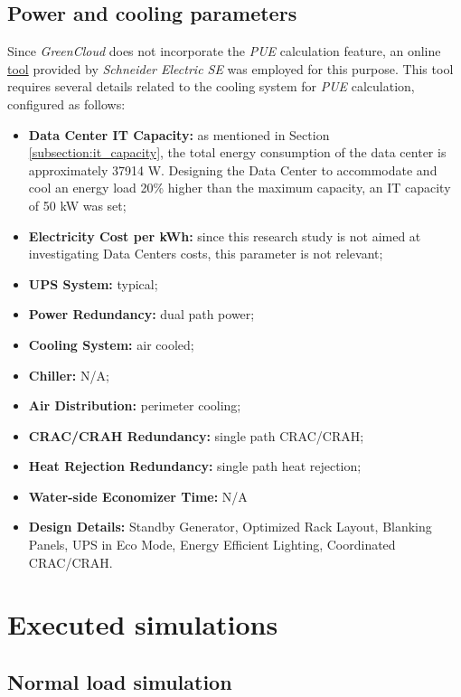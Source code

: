 \subsection{Power and cooling parameters}
Since \emph{GreenCloud} does not incorporate the \emph{PUE} calculation feature, an online \href{https://www.se.com/ww/en/work/solutions/system/s1/data-center-and-network-systems/trade-off-tools/data-center-efficiency-and-pue-calculator/}{tool} provided by \emph{Schneider Electric SE} was employed for this purpose. This tool requires several details related to the cooling system for \emph{PUE} calculation, configured as follows:
\begin{itemize}
    \item \textbf{Data Center IT Capacity:} as mentioned in Section \ref{subsection:it_capacity}, the total energy consumption of the data center is approximately 37914 W. Designing the Data Center to accommodate and cool an energy load 20\% higher than the maximum capacity, an IT capacity of 50 kW was set;
    \item \textbf{Electricity Cost per kWh:} since this research study is not aimed at investigating Data Centers costs, this parameter is not relevant;
    \item \textbf{UPS System:} typical;
    \item \textbf{Power Redundancy:} dual path power;
    \item \textbf{Cooling System:} air cooled;
    \item \textbf{Chiller:} N/A;
    \item \textbf{Air Distribution:} perimeter cooling;
    \item \textbf{CRAC/CRAH Redundancy:} single path CRAC/CRAH;
    \item \textbf{Heat Rejection Redundancy:} single path heat rejection;
    \item \textbf{Water-side Economizer Time:} N/A
    \item \textbf{Design Details:} Standby Generator, Optimized Rack Layout, Blanking Panels, UPS in Eco Mode, Energy Efficient Lighting, Coordinated CRAC/CRAH.
\end{itemize}

\section{Executed simulations}

\subsection{Normal load simulation}

